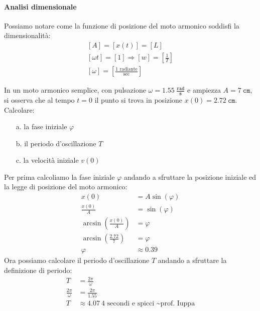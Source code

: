         \paragraph{Analisi dimensionale} 
            Possiamo notare come la funzione di posizione del moto armonico soddisfi la dimensionalità:
            $$
                \begin{aligned}
                    \left[A\right]=\left[x(t)\right]=\left[L\right]\\
                    \left[\omega t\right]=\left[1\right]\Rightarrow \left[w\right] = \left[\frac{1}{T}\right]\\
                    \left[\omega\right] = \left[\frac{1 \text{ radiante}}{\text{sec}}\right]
                \end{aligned}
            $$
        \begin{problem}[1.26]
            In un moto armonico semplice, con pulsazione $\omega=1.55\ \frac{\texttt{rad}}{\texttt{s}}$ e ampiezza $A=7\ \texttt{cm}$, si osserva che al tempo $t=0$ il punto si trova in posizione $x(0)=2.72\ \texttt{cm}$.\newline
            Calcolare:\begin{enumerate}
                \item[a.] la fase iniziale $\varphi$ 
                \item[b.] il periodo d'oscillazione $T$
                \item[c.] la velocità iniziale $v(0)$
            \end{enumerate}
        \end{problem}
        Per prima calcoliamo la fase iniziale $\varphi$ andando a sfruttare la posizione iniziale ed la legge di posizione del moto armonico:
        $$
            \begin{aligned}
                x(0) &= A\sin(\varphi)\\
                \frac{x(0)}{A} &= \sin(\varphi)\\
                \arcsin\left(\frac{x(0)}{A}\right) &= \varphi\\
                \arcsin\left(\frac{2.72}{7}\right) &= \varphi\\
                \varphi &\approx 0.39
            \end{aligned}
        $$
        Ora possiamo calcolare il periodo d'oscillazione $T$ andando a sfruttare la definizione di periodo:
        $$
            \begin{aligned}
                T &= \frac{2\pi}{\omega}\\
                \frac{2\pi}{\omega} &= \frac{2\pi}{1.55}\\
                T &\approx 4.07\ \text{4 secondi e spicci \textasciitilde prof. Iuppa}
            \end{aligned}
        $$
